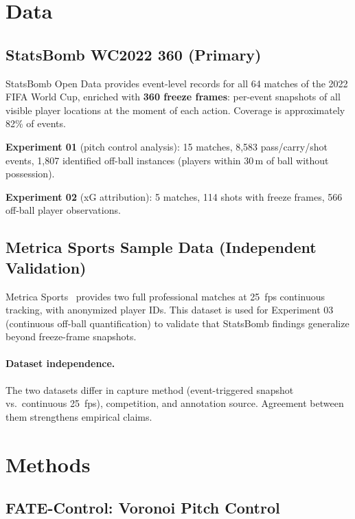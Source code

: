 \documentclass[10pt,twocolumn]{article}
\begin{document}
\section{Data}
\label{sec:data}

\subsection{StatsBomb WC2022 360 (Primary)}

StatsBomb Open Data provides event-level records for all 64 matches of the 2022 FIFA World Cup, enriched with \textbf{360 freeze frames}: per-event snapshots of all visible player locations at the moment of each action. Coverage is approximately 82\% of events.

\textbf{Experiment 01} (pitch control analysis): 15 matches, 8,583 pass/carry/shot events, 1,807 identified off-ball instances (players within 30\,m of ball without possession).

\textbf{Experiment 02} (xG attribution): 5 matches, 114 shots with freeze frames, 566 off-ball player observations.

\subsection{Metrica Sports Sample Data (Independent Validation)}

Metrica Sports~\citep{metrica2020} provides two full professional matches at 25~fps continuous tracking, with anonymized player IDs. This dataset is used for Experiment 03 (continuous off-ball quantification) to validate that StatsBomb findings generalize beyond freeze-frame snapshots.

\paragraph{Dataset independence.} The two datasets differ in capture method (event-triggered snapshot vs.\ continuous 25~fps), competition, and annotation source. Agreement between them strengthens empirical claims.

\section{Methods}
\label{sec:methods}

\subsection{FATE-Control: Voronoi Pitch Control}
\end{document}
